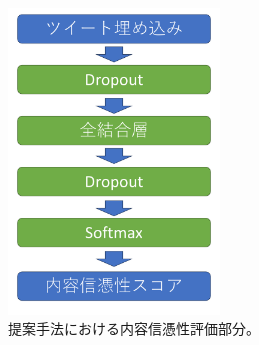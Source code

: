 \begin{figure}[ht]
    \centering
    \includegraphics[width=0.5\textwidth]{./figures/ieice_nnfig.pdf} %
    \caption{提案手法における内容信憑性評価部分。}
    \label{fig:content}
\end{figure}

